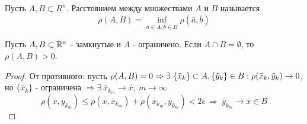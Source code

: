 \begin{definition}
    Пусть $A,B\subset R^n$. Расстоянием между множествами $A$ и $B$ называется 
    \[\rho(A,B)=\inf\limits_{\bar{a}\in A,\bar{b}\in B}\rho(\bar{a}, \bar{b})\]
\end{definition} 
\begin{theorem}
    Пусть $A,B \subset \mathbb{R}^n$ - замкнутые и $A$ - ограничено. Если $A\cap B=\emptyset$, то $\rho(A,B)>0$. 
\end{theorem} 
\begin{proof}
    От противного: пусть $\rho(A,B)=0 \Rightarrow \exists\ \{\bar{x}_k\}\subset A,\\ \{\bar{y}_k\}\in B: \rho(\bar{x}_k, \bar{y}_k)\to 0$, но $\{\bar{x}_k\}$ - ограничена $\Rightarrow \exists\ \bar{x}_{k_m}\to \bar{x},\ m\to \infty$
    \[\rho(\bar{x}, \bar{y}_{k_m})\leq \rho(\bar{x}, \bar{x}_{k_m})+\rho(\bar{x}_{k_m}, \bar{y}_{k_m})<2\epsilon\ \Rightarrow\ \bar{y}_{k_m}\to \bar{x}\in B\]
\end{proof} 
